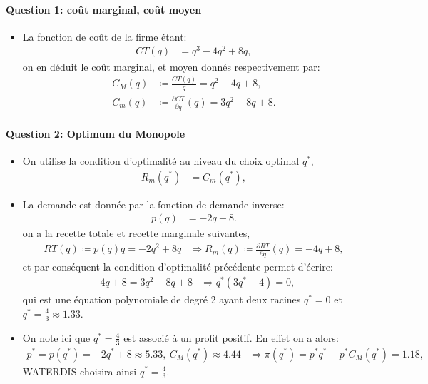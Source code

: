 \documentclass[notes, ignorenonframetext, compress, 9pt, xcolor=svgnames, aspectratio=169]{beamer}
\begin{document}
 \begin{frame}
 [allowframebreaks]{\insertsection}
 \framesubtitle{Question 1: coût marginal, coût moyen}
 \begin{itemize}
 \item La fonction de coût de la firme étant:
 \begin{align}
 CT(q) &= q^3 - 4q^2 + 8q,
 \label{eq13}
 \end{align}
 on en déduit le coût marginal, et moyen donnés respectivement par:
 \begin{align}
 C_M(q)&\coloneqq \frac{CT(q)}{q} = q^2 - 4q + 8,\\
 C_m(q)&\coloneqq \frac{\partial CT}{\partial q}(q) = 3q^2 - 8q + 8.
 \label{eq14}
 \end{align}

 \end{itemize}
 \end{frame}
 
  \begin{frame}
 [allowframebreaks]{\insertsection}
 \framesubtitle{Question 2: Optimum du Monopole}
 \begin{itemize}
 \item On utilise la condition d'optimalité au niveau du choix optimal $q^*$,
 \begin{align*}
 R_m(q^*) &= C_m(q^*),
 \end{align*}
\item La demande est donnée par la fonction de demande inverse:
 \begin{align}
p(q)&= -2q + 8.
\label{eq15}
\end{align}
on a la recette totale et recette marginale suivantes,
 \begin{align*}
 RT(q) \coloneqq p(q)q = -2q^2+8q &\Rightarrow R_m(q)\coloneqq \frac{\partial RT}{\partial q}(q) = -4q+8,
 \end{align*}
 et par conséquent la condition d'optimalité précédente permet d'écrire:
 \begin{align*}
   -4q+8 = 3q^2 - 8q + 8 &\Rightarrow q^*(3q^* - 4) = 0,
 \end{align*}
 qui est une équation polynomiale de degré 2 ayant deux racines $q^* = 0$ et $q^* = \frac{4}{3}\approx 1.33$. 
 \item On note ici que  $q^* = \frac{4}{3}$ est associé à un profit positif. En effet on a alors:
 \begin{align*}
 p^* =p(q^*) = -2q^* + 8\approx  5.33, \ C_M(q^*)  \approx 4.44 &\Rightarrow \pi(q^*) = p^*q^* -   p^*C_M(q^*)  = 1.18,
 \end{align*}
WATERDIS choisira ainsi $q^* = \frac{4}{3}$.
  \end{itemize}
 \end{frame}
 
\end{document}
